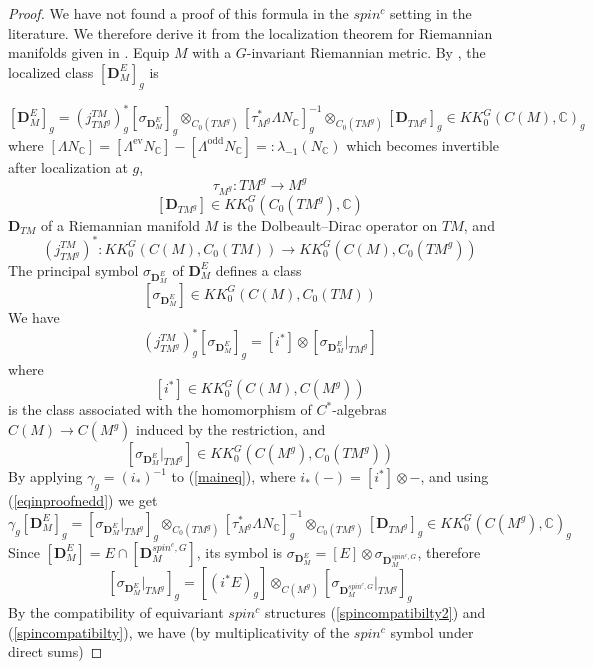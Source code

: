 \documentclass[11pt,leqno,twoside]{amsart}
\theoremstyle{plainsl}
\theoremstyle{definition}
\newcommand{\bD}{\mathbf{D}}
\begin{document}
\begin{proof}
We have not found a proof of this formula in the ${spin}^c$ setting in the literature. We therefore derive it from the localization theorem for Riemannian manifolds given in \cite{HW}. Equip $M$ with a $G$-invariant Riemannian metric. By \cite[Prop.~5.20]{HW}, the localized class $[\bD_M^E]_g$ is



\begin{equation}\label{maineq}
    [\bD_M^E]_g=
(j^{TM}_{TM^g})^*_g[\sigma_{\bD_M^E}]_g
\otimes_{C_0(TM^g)}
[\tau^*_{M^g}\Lambda N_{\mathbb{C}}]^{-1}_g
\otimes_{C_0(TM^g)}
[\bD_{TM^g}]_g
\in KK_0^G(C(M),\mathbb{C})_g
\end{equation}
where $[\Lambda N_{\mathbb C}]=[\Lambda^{\mathrm{ev}}N_{\mathbb C}]
-[\Lambda^{\mathrm{odd}}N_{\mathbb C}]=:\lambda_{-1}(N_{\mathbb C})$ which becomes invertible after localization at $g$, 
\[
\tau_{M^g}: TM^g\rightarrow M^g
\]
\[
[\bD_{TM^g}] \in KK_0^G(C_0(TM^g),\mathbb{C})
\]
$\bD_{TM}$ of a Riemannian manifold $M$ is the Dolbeault--Dirac operator on $TM$, and
\[
(j^{TM}_{TM^g})^*:
KK_0^G(C(M),C_0(TM))
\rightarrow
KK_0^G(C(M),C_0(TM^g))
\]
The principal symbol $\sigma_{\bD_M^E}$ of $\bD_M^E$ defines a class 
\[[\sigma_{\bD_M^E}] \in KK_0^G(C(M),C_0(TM))\]
 We have
 \begin{equation}\label{eqinproofnedd}
     (j^{TM}_{TM^g})^*_g[\sigma_{\bD_M^E}]_g
=
[i^*]\otimes[\sigma_{\bD_M^E}|_{TM^g}]
 \end{equation}
where
\[
[i^*] \in KK_0^G(C(M),C(M^g))
\]
is the class associated with the homomorphism of $C^*$-algebras
$C(M)\rightarrow C(M^g)$ induced by the restriction, and
\[
[\sigma_{\bD_M^E}|_{TM^g}]
\in
KK_0^G(C(M^g),C_0(TM^g))
\]
By applying $\gamma_g=(i_*)^{-1}$ to (\ref{maineq}), where $
i_*(-)=[i^*]\otimes -
$, and using (\ref{eqinproofnedd})
we get
\begin{equation}\label{eq2}
    \gamma_g[\bD_M^E]_g=
[\sigma_{\bD_M^E}|_{TM^g}]_g
\otimes_{C_0(TM^g)}
[\tau^*_{M^g}\Lambda N_{\mathbb{C}}]^{-1}_g
\otimes_{C_0(TM^g)}
[\bD_{TM^g}]_g
\in KK_0^G(C(M^g),\mathbb{C})_g
\end{equation}
Since $[\bD_M^E]=E\cap [\bD^{spin^c,G}_M]$,
its symbol is
$
\sigma_{\bD_M^E}
=
[E]\otimes \sigma_{\bD^{spin^c,G}_M}
$, therefore
\[
[\sigma_{\bD_M^E}|_{TM^g}]_g
=
[(i^*E)_g]
\otimes_{C(M^g)}
[\sigma_{\bD^{spin^c,G}_M}|_{TM^g}]_g
\]
By the compatibility of equivariant $spin^c$ structures (\ref{spincompatibilty2}) and (\ref{spincompatibilty}), we have (by multiplicativity of the $spin^c$ symbol under direct sums)

\end{proof}
\end{document}
